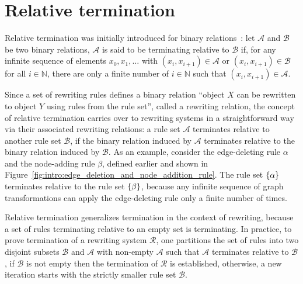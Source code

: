 

\section{Relative termination} 
Relative termination was initially introduced for binary relations~\cite{klop1987term}: let $\mathcal{A}$ and $\mathcal{B}$ be two binary relations, $\mathcal{A}$ is said to be terminating relative to $\mathcal{B}$ if, for any infinite sequence of elements \( x_0, x_1, \ldots \) with \( (x_i,x_{i+1}) \mathop{\in} \mathcal{A} \) or \( (x_i,x_{i+1}) \mathop{\in} \mathcal{B} \) for all \( i \mathop{\in} \mathbb{N} \), there are only a finite number of \( i \mathop{\in} \mathbb{N} \) such that \( (x_i,x_{i+1}) \mathop{\in} \mathcal{A} \).

Since a set of rewriting rules defines a binary relation \enquote{object $X$ can be rewritten to object $Y$ using rules from the rule set}, called a rewriting relation,
the concept of relative termination
carries over to rewriting systems in a straightforward way via their associated rewriting relations: a rule set $\mathcal{A}$ terminates relative to another rule set $\mathcal{B}$, if the binary relation induced by $\mathcal{A}$ terminates relative to the binary relation induced by $\mathcal{B}$.
As an example, consider the edge-deleting rule $\alpha$ and the node-adding rule $\beta$, defined earlier and shown in Figure~\ref{fig:intro:edge_deletion_and_node_addition_rule}. 
The rule set $\{\alpha\}$ terminates relative to the rule set $\{\beta\}$, because any infinite sequence of graph transformations can apply the edge-deleting rule only a finite number of times.

Relative termination generalizes termination in the context of rewriting, because a set of rules terminating relative to an empty set is terminating. In practice, to prove termination of a rewriting system $\mathcal{R}$, one partitions the set of rules into two disjoint subsets \( \mathcal{B} \) and \( \mathcal{A} \) with non-empty $\mathcal{A}$ such that \( \mathcal{A} \) terminates relative to \( \mathcal{B} \), if $\mathcal{B}$ is not empty then the termination of $\mathcal{R}$ is established, otherwise, a new iteration starts with the strictly smaller rule set $\mathcal{B}$.
 
